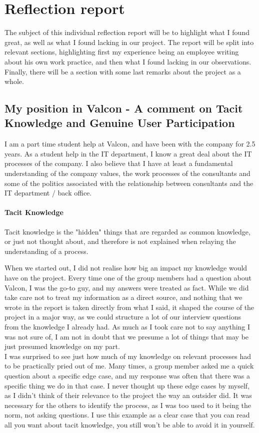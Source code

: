 \chapter*{Reflection report}

The subject of this individual reflection report will be to highlight what I found great, as well as what I found lacking in our project. The report will be split into relevant sections, highlighting first my experience being an employee writing about his own work practice, and then what I found lacking in our observations. Finally, there will be a section with some last remarks about the project as a whole.

\section*{My position in Valcon - A comment on Tacit Knowledge and Genuine User Participation}
I am a part time student help at Valcon, and have been with the company for 2.5 years. As a student help in the IT department, I know a great deal about the IT processes of the company. I also believe that I have at least a fundamental understanding of the company values, the work processes of the consultants and some of the politics associated with the relationship between consultants and the IT department / back office.

\subsubsection{Tacit Knowledge}
Tacit knowledge is the "hidden" things that are regarded as common knowledge, or just not thought about, and therefore is not explained when relaying the understanding of a process.

When we started out, I did not realise how big an impact my knowledge would have on the project. Every time one of the group members had a question about Valcon, I was the go-to guy, and my answers were treated as fact. While we did take care not to treat my information as a direct source, and nothing that we wrote in the report is taken directly from what I said, it shaped the course of the project in a major way, as we could structure a lot of our interview questions from the knowledge I already had.
As much as I took care not to say anything I was not sure of, I am not in doubt that we presume a lot of things that may be just presumed knowledge on my part. \\

I was surprised to see just how much of my knowledge on relevant processes had to be practically pried out of me. Many times, a group member asked me a quick question about a specific edge case, and my response was often that there was a specific thing we do in that case. I never thought up these edge cases by myself, as I didn't think of their relevance to the project the way an outsider did. It was necessary for the others to identify the process, as I was too used to it being the norm, not asking questions. I use this example as a clear case that you can read all you want about tacit knowledge, you still won't be able to avoid it in yourself.

